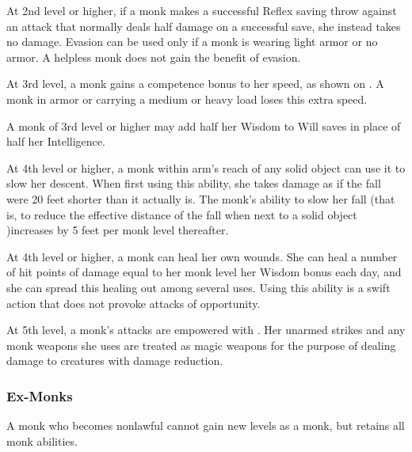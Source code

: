  At 2nd level or higher, if a monk makes a successful Reflex saving throw against an attack that normally deals half damage on a successful save, she instead takes no damage. Evasion can be used only if a monk is wearing light armor or no armor. A helpless monk does not gain the benefit of evasion.

 At 3rd level, a monk gains a competence bonus to her speed, as shown on . A monk in armor or carrying a medium or heavy load loses this extra speed.

 A monk of 3rd level or higher may add half her Wisdom to Will saves in place of half her Intelligence.

  At 4th level or higher, a monk within arm's reach of any solid object can use it to slow her descent. When first using this ability, she takes damage as if the fall were 20 feet shorter than it actually is. The monk's ability to slow her fall (that is, to reduce the effective distance of the fall when next to a solid object )increases by 5 feet per monk level thereafter.

  At 4th level or higher, a monk can heal her own wounds. She can heal a number of hit points of damage equal to her monk level \mtimes her Wisdom bonus each day, and she can spread this healing out among several uses.  Using this ability is a swift action that does not provoke attacks of opportunity.

 At 5th level, a monk's attacks are empowered with \ki. Her unarmed strikes and any monk weapons she uses are treated as magic weapons for the purpose of dealing damage to creatures with damage reduction.

\subsubsection{Ex-Monks}
A monk who becomes nonlawful cannot gain new levels as a monk, but retains all monk abilities.

